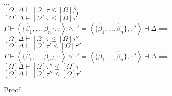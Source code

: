 \documentclass{article}
\newcommand{\betahat}{\hat{\beta}}
\newcommand{\lub}{\ensuremath{\vee}}
\newcommand{\glb}{\ensuremath{\wedge}}
\newcommand{\pair}[2]{\left<#1,#2\right>}
\begin{document}
\begin{tabbing}
\> $\ldots$\\
\> $[\Omega]\Delta \vdash [\Omega]\tau \leq [\Omega]\betahat_1$\\
\> $[\Omega]\Delta \vdash [\Omega]\tau \leq [\Omega]\tau'$\\
$\Gamma \vdash \pair{\{\betahat_1,\ldots,\betahat_n\}}{\tau} \glb \tau' = \pair{\{\betahat_1,\ldots,\betahat_n\}}{\tau''} \dashv \Delta \implies$\\
\> $[\Omega]\Delta \vdash [\Omega]\tau \leq [\Omega]\tau''$\\
\> $[\Omega]\Delta \vdash [\Omega]\tau' \leq [\Omega]\tau''$\\
$\Gamma \vdash \pair{\{\betahat_1,\ldots,\betahat_n\}}{\tau} \lub \tau' = \pair{\{\betahat_1,\ldots,\betahat_n\}}{\tau''} \dashv \Delta \implies$\\
\> $[\Omega]\Delta \vdash [\Omega]\tau'' \leq [\Omega]\tau$\\
\> $[\Omega]\Delta \vdash [\Omega]\tau'' \leq [\Omega]\tau'$\\
\end{tabbing}

Proof.
\end{document}

